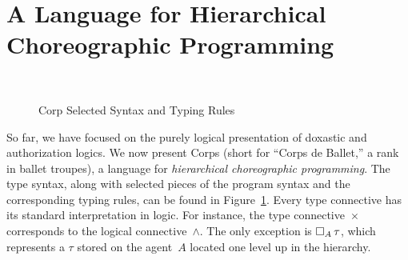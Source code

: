 \section{A Language for Hierarchical Choreographic Programming}
\label{sec:lang-hier-chor}

\begin{figure}
  \centering
  \begin{syntax}
    \category[Types]{\tau}
    \alternative{\unit}
    \alternative{\void}
    \\
  \end{syntax}
  \caption{Corp Selected Syntax and Typing Rules}
  \label{fig:choreo-types}
\end{figure}

So far, we have focused on the purely logical presentation of doxastic and authorization logics.
We now present Corps (short for ``Corps de Ballet,'' a rank in ballet troupes), a language for \emph{hierarchical choreographic programming}.
The type syntax, along with selected pieces of the program syntax and the corresponding typing rules, can be found in Figure~\ref{fig:choreo-types}.
Every type connective has its standard interpretation in logic.
For instance, the type connective~$\times$ corresponds to the logical connective~$\land$.
The only exception is $\mathop{\square_{A}} \tau$, which represents a $\tau$ stored on the agent~$A$ located one level up in the hierarchy.

